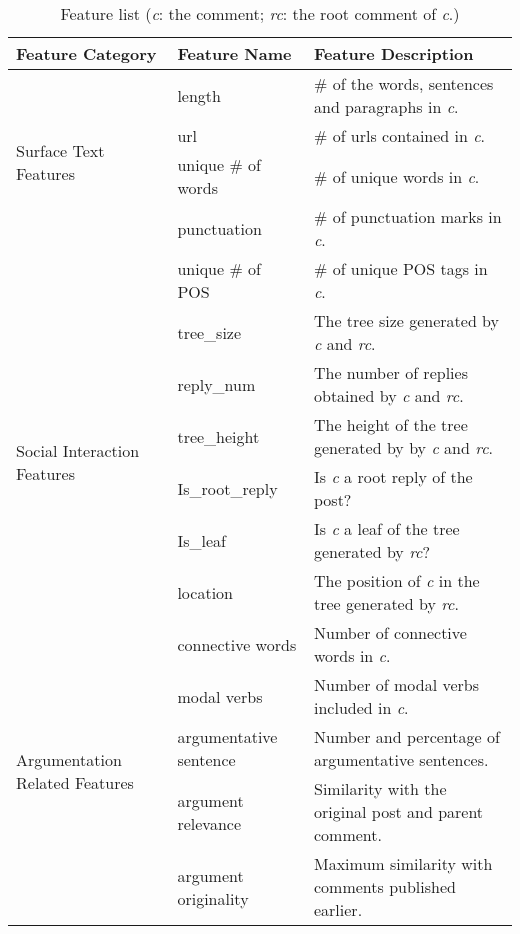 \documentclass[11pt]{article}
\begin{document}
\begin{table*}[t]
\small
\begin{center}
\begin{tabular}{l|l|l}
\hline
Feature Category& Feature Name& Feature Description\\
\hline
\multirow{4}{*}{Surface Text Features} 
&length& \# of the words, sentences and paragraphs in \emph{c}.\\
&url& \# of urls contained in \emph{c}.\\
&unique \# of words& \# of unique words in \emph{c}.\\
&punctuation & \# of punctuation marks in \emph{c}.\\
&unique \# of POS & \# of unique POS tags in \emph{c}.\\
\hline
\multirow{6}{*}{Social Interaction Features} 
&tree\_size& The tree size generated by \emph{c} and \emph{rc}.\\
&reply\_num&The number of replies obtained by \emph{c} and \emph{rc}.\\
&tree\_height & The height of the tree generated by by \emph{c} and \emph{rc}.\\
&Is\_root\_reply& Is \emph{c} a root reply of the post?\\
&Is\_leaf& Is \emph{c} a leaf of the tree generated by \emph{rc}?\\
&location & The position of \emph{c} in the tree generated by \emph{rc}. \\
\hline
\multirow{5}{*}{Argumentation Related Features} 
& connective words & Number of connective words in \emph{c}.\\
& modal verbs & Number of modal verbs included in  \emph{c}.\\
& argumentative sentence & Number and percentage of argumentative sentences.\\
\cline{2-3}
& argument relevance & Similarity with the original post and parent comment.\\
& argument originality & Maximum similarity with comments published earlier.\\
\hline
\end{tabular}
\end{center}
\caption{Feature list (\emph{c}: the comment; \emph{rc}: the root comment of \emph{c}.)}
\label{tab:feature}
\end{table*}
\end{document}
